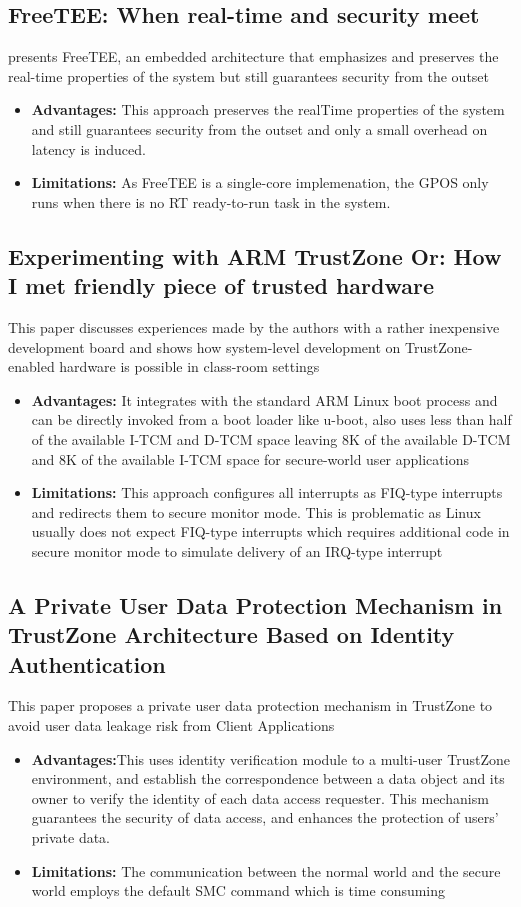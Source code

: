 \documentclass[conference]{IEEEtran}
\begin{document}
\subsection{FreeTEE: When real-time and security meet}
presents FreeTEE, an embedded architecture that emphasizes and preserves the real-time properties of the system but still guarantees security from the outset
\begin{itemize}
    \item \textbf{Advantages:} This approach preserves the realTime properties of the system and still guarantees security from the outset and only a small overhead on latency is induced.
    \item \textbf{Limitations:} As FreeTEE is a single-core implemenation, the GPOS only runs when there is no RT ready-to-run task in the system.
\end{itemize}


\subsection{Experimenting with ARM TrustZone Or: How I met friendly piece of trusted hardware}
This paper discusses experiences made by the authors with a rather inexpensive development board and shows how system-level development on TrustZone-enabled hardware is possible in class-room settings
\begin{itemize}
    \item \textbf{Advantages:} It integrates with the standard ARM Linux boot process and can be directly invoked from a boot loader like u-boot, also uses less than half of the available I-TCM and D-TCM space leaving 8K of the available D-TCM and 8K of the available I-TCM space for secure-world user applications
    \item \textbf{Limitations:} This approach configures all interrupts as FIQ-type interrupts and redirects them to secure monitor mode. This is problematic as Linux usually does not expect FIQ-type interrupts which requires additional code in secure monitor mode to simulate delivery of an IRQ-type interrupt
\end{itemize}


\subsection{A Private User Data Protection Mechanism in TrustZone Architecture Based on Identity Authentication}
This paper proposes a private user data protection mechanism in TrustZone to avoid user data leakage risk from Client Applications
\begin{itemize}
    \item \textbf{Advantages:}This uses identity verification module to a multi-user TrustZone environment, and establish the correspondence between a data object and its owner to verify the identity of each data access requester. This mechanism guarantees the security of data access, and enhances the protection of users’ private data.
    \item \textbf{Limitations:} The communication between the normal world and the secure world employs the default SMC command which is time consuming
\end{itemize}
\end{document}
